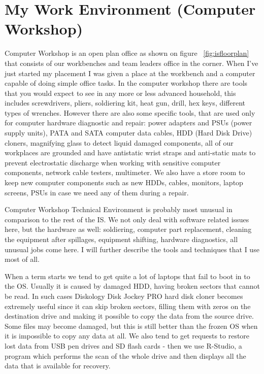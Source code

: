 \documentclass[10pt,a4paper,headinclude=true]{report}
\begin{document}
\section{My Work Environment (Computer Workshop)}
Computer Workshop is an open plan office as shown on figure ~\ref{fig:isfloorplan} that consists of our workbenches and team leaders office in the corner. When I've just started my placement I was given a place at the workbench and a computer capable of doing simple office tasks. In the computer workshop there are tools that you would expect to see in any more or less advanced household, this includes screwdrivers, pliers, soldiering kit, heat gun, drill, hex keys, different types of wrenches. However there are also some specific tools, that are used only for computer hardware diagnostic and repair: power adapters and PSUs (power supply units), PATA and SATA computer data cables, HDD (Hard Disk Drive) cloners, magnifying glass to detect liquid damaged components, all of our workplaces are grounded and have antistatic wrist straps and anti-static mats to prevent electrostatic discharge when working with sensitive computer components, network cable testers, multimeter. We also have a store room to keep new computer components such as new HDDs, cables, monitors, laptop screens, PSUs in case we need any of them during a repair.    

Computer Workshop Technical Environment is probably most unusual in comparison to the rest of the IS. We not only deal with software related issues here, but the hardware as well: soldiering, computer part replacement, cleaning the equipment after spillages, equipment shifting, hardware diagnostics, all unusual jobs come here. I will further describe the tools and techniques that I use most of all. 

When a term starts we tend to get quite a lot of laptops that fail to boot in to the OS. Usually it is caused by damaged HDD, having broken sectors that cannot be read. In such cases Diskology Disk Jockey PRO hard disk cloner\cite{DiskCloner} becomes extremely useful since it can skip broken sectors, filling them with zeros on the destination drive and making it possible to copy the data from the source drive. Some files may become damaged, but this is still better than the frozen OS when it is impossible to copy any data at all. We also tend to get requests to restore lost data from USB pen drives and SD flash cards - then we use R-Studio, a program which performs the scan of the whole drive and then displays all the data that is available for recovery. 
\end{document}
